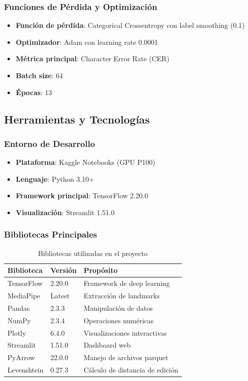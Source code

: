 \documentclass[12pt,a4paper]{article}
\begin{document}
\subsubsection{Funciones de Pérdida y Optimización}

\begin{itemize}
    \item \textbf{Función de pérdida}: Categorical Crossentropy con label smoothing (0.1)
    \item \textbf{Optimizador}: Adam con learning rate 0.0001
    \item \textbf{Métrica principal}: Character Error Rate (CER)
    \item \textbf{Batch size}: 64
    \item \textbf{Épocas}: 13
\end{itemize}

\subsection{Herramientas y Tecnologías}

\subsubsection{Entorno de Desarrollo}

\begin{itemize}
    \item \textbf{Plataforma}: Kaggle Notebooks (GPU P100)
    \item \textbf{Lenguaje}: Python 3.10+
    \item \textbf{Framework principal}: TensorFlow 2.20.0
    \item \textbf{Visualización}: Streamlit 1.51.0
\end{itemize}

\subsubsection{Bibliotecas Principales}

\begin{table}[H]
\centering
\caption{Bibliotecas utilizadas en el proyecto}
\begin{tabular}{@{}lll@{}}
\toprule
\textbf{Biblioteca} & \textbf{Versión} & \textbf{Propósito} \\
\midrule
TensorFlow & 2.20.0 & Framework de deep learning \\
MediaPipe & Latest & Extracción de landmarks \\
Pandas & 2.3.3 & Manipulación de datos \\
NumPy & 2.3.4 & Operaciones numéricas \\
Plotly & 6.4.0 & Visualizaciones interactivas \\
Streamlit & 1.51.0 & Dashboard web \\
PyArrow & 22.0.0 & Manejo de archivos parquet \\
Levenshtein & 0.27.3 & Cálculo de distancia de edición \\
\bottomrule
\end{tabular}
\end{table}
\end{document}
